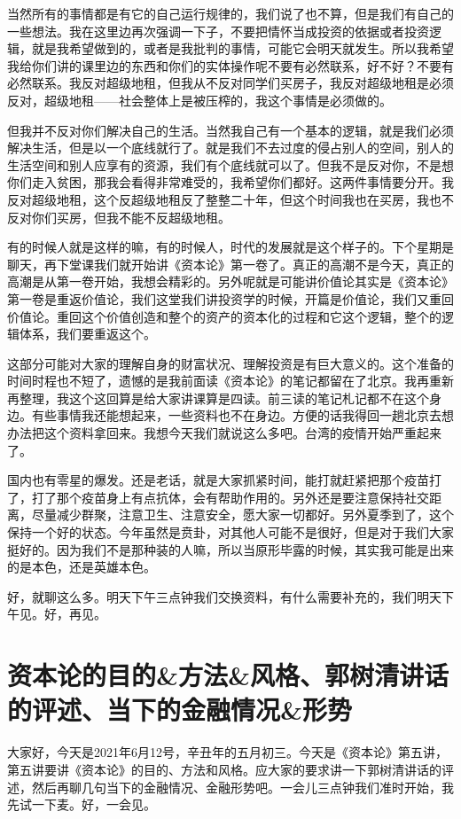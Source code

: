 \documentclass[UTF8, 12pt, a4paper]{ctexrep}
\begin{document}
当然所有的事情都是有它的自己运行规律的，我们说了也不算，但是我们有自己的一些想法。我在这里边再次强调一下子，不要把情怀当成投资的依据或者投资逻辑，就是我希望做到的，或者是我批判的事情，可能它会明天就发生。所以我希望我给你们讲的课里边的东西和你们的实体操作呢不要有必然联系，好不好？不要有必然联系。我反对超级地租，但我从不反对同学们买房子，我反对超级地租是必须反对，超级地租——社会整体上是被压榨的，我这个事情是必须做的。

但我并不反对你们解决自己的生活。当然我自己有一个基本的逻辑，就是我们必须解决生活，但是以一个底线就行了。就是我们不去过度的侵占别人的空间，别人的生活空间和别人应享有的资源，我们有个底线就可以了。但我不是反对你，不是想你们走入贫困，那我会看得非常难受的，我希望你们都好。这两件事情要分开。我反对超级地租，这个反超级地租反了整整二十年，但这个时间我也在买房，我也不反对你们买房，但我不能不反超级地租。

有的时候人就是这样的嘛，有的时候人，时代的发展就是这个样子的。下个星期是聊天，再下堂课我们就开始讲《资本论》第一卷了。真正的高潮不是今天，真正的高潮是从第一卷开始，我想会精彩的。另外呢就是可能讲价值论其实是《资本论》第一卷是重返价值论，我们这堂我们讲投资学的时候，开篇是价值论，我们又重回价值论。重回这个价值创造和整个的资产的资本化的过程和它这个逻辑，整个的逻辑体系，我们要重返这个。

这部分可能对大家的理解自身的财富状况、理解投资是有巨大意义的。这个准备的时间时程也不短了，遗憾的是我前面读《资本论》的笔记都留在了北京。我再重新再整理，我这个这回算是给大家讲课算是四读。前三读的笔记札记都不在这个身边。有些事情我还能想起来，一些资料也不在身边。方便的话我得回一趟北京去想办法把这个资料拿回来。我想今天我们就说这么多吧。台湾的疫情开始严重起来了。

国内也有零星的爆发。还是老话，就是大家抓紧时间，能打就赶紧把那个疫苗打了，打了那个疫苗身上有点抗体，会有帮助作用的。另外还是要注意保持社交距离，尽量减少群聚，注意卫生、注意安全，愿大家一切都好。另外夏季到了，这个保持一个好的状态。今年虽然是贲卦，对其他人可能不是很好，但是对于我们大家挺好的。因为我们不是那种装的人嘛，所以当原形毕露的时候，其实我可能是出来的是本色，还是英雄本色。

好，就聊这么多。明天下午三点钟我们交换资料，有什么需要补充的，我们明天下午见。好，再见。

\section{资本论的目的\&方法\&风格、郭树清讲话的评述、当下的金融情况\&形势}

大家好，今天是2021年6月12号，辛丑年的五月初三。今天是《资本论》第五讲，第五讲要讲《资本论》的目的、方法和风格。应大家的要求讲一下郭树清讲话的评述，然后再聊几句当下的金融情况、金融形势吧。一会儿三点钟我们准时开始，我先试一下麦。好，一会见。
\end{document}
